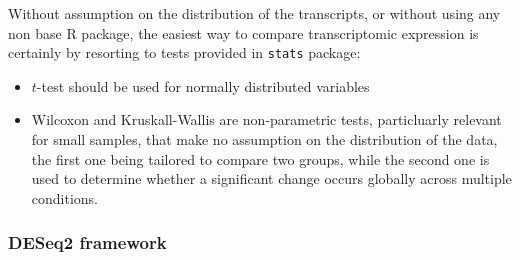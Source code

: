 Without assumption on the distribution of the transcripts, or without using any non base R package, the easiest way to compare transcriptomic expression is certainly by resorting to tests provided in \texttt{stats} package:

\begin{itemize}

\item
  \(t\)-test should be used for normally distributed variables
\item
  Wilcoxon and Kruskall-Wallis are non-parametric tests, particluarly relevant for small samples, that make no assumption on the distribution of the data, the first one being tailored to compare two groups, while the second one is used to determine whether a significant change occurs globally across multiple conditions. 
\end{itemize}

\begin{Shaded}
\begin{Highlighting}[]
\OtherTok{\textless{}{-}} \NormalTok{(}\NormalTok{)}


\OtherTok{\textless{}{-}} \NormalTok{(}
   \NormalTok{,}
   \NormalTok{,}
   \NormalTok{)}

\OtherTok{\textless{}{-}} \NormalTok{(}
   \NormalTok{,}
   \NormalTok{,}
   \NormalTok{)}
\end{Highlighting}
\end{Shaded}


\subsubsection{DESeq2 framework} 
\label{deseq2-framework}

